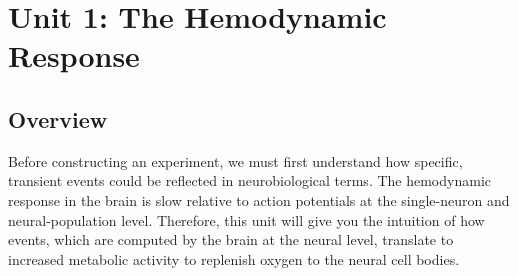 \documentclass[10pt]{article}
\begin{document}
\section{Unit 1: The Hemodynamic Response}
\label{sec:unit1}
\setcounter{section}{1}
	\subsection{Overview}
	\label{subsec:u1overview}
		Before constructing an experiment, we must first understand how specific, transient events could be reflected in neurobiological terms.
		The hemodynamic response in the brain is slow relative to action potentials at the single-neuron and neural-population level.
		Therefore, this unit will give you the intuition of how events, which are computed by the brain at the neural level, translate to increased metabolic activity to replenish oxygen to the neural cell bodies.
\end{document}
